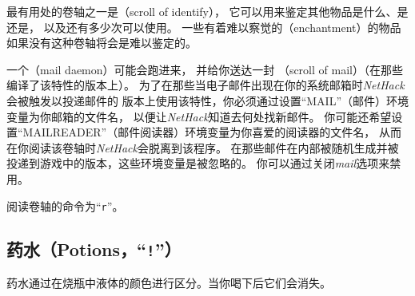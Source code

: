 \documentclass[a4paper, 10pt]{article}
\begin{document}
最有用处的卷轴之一是{\it \zhTransScrollOfIdentify}（scroll of identify），
它可以用来鉴定其他物品是什么、是\zhTransCursed{}还是\zhTransBlessed，
以及还有多少次可以使用。
一些有着难以察觉的\zhTransEnchantments{}（enchantment）的物品如果没有这种卷轴将会是难以鉴定的。

一个\zhTransMailDaemon（mail daemon）可能会跑进来，
并给你送达一封{\it \zhTransScrollOfMail}
（scroll of mail）（在那些编译了该特性的版本上）。
为了在那些当电子邮件出现在你的系统邮箱时{\it NetHack\/}会被触发以投递邮件的
版本上使用该特性，你必须通过设置“MAIL”（邮件）环境变量为你邮箱的文件名，
以便让{\it NetHack\/}知道去何处找新邮件。
你可能还希望设置“MAILREADER”（邮件阅读器）环境变量为你喜爱的阅读器的文件名，
从而在你阅读该卷轴时{\it NetHack\/}会脱离到该程序。
在那些邮件在内部被随机生成并被投递到游戏中的版本，这些环境变量是被忽略的。
你可以通过关闭{\it mail\/}选项来禁用\zhTransMailDaemon。

阅读卷轴的命令为“{\tt r}”。

\subsection*{药水（Potions，“{\tt !}”）}

药水通过在烧瓶中液体的颜色进行区分。当你喝下后它们会消失。
\end{document}
